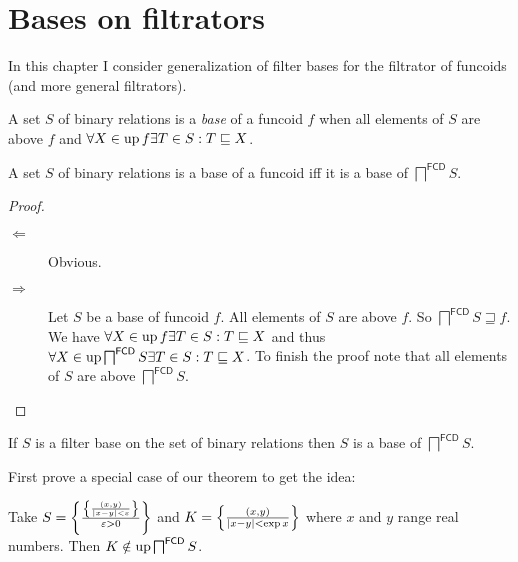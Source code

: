 \chapter{Bases on filtrators}

In this chapter I consider generalization of filter bases
for the filtrator of funcoids (and more general filtrators).


\begin{defn}
  A set $S$ of binary relations is a \emph{base} of a funcoid $f$ when all elements
  of $S$ are above $f$ and $\forall X \in \operatorname{up} f \exists T \in S : T
  \sqsubseteq X$.
\end{defn}

\begin{prop}
  A set $S$ of binary relations is a base of a funcoid iff it is a base of
  $\bigsqcap^{\mathsf{FCD}} S$.
\end{prop}

\begin{proof}
  ~
  \begin{description}
    \item[$\Leftarrow$] Obvious.
    
    \item[$\Rightarrow$] Let $S$ be a base of funcoid $f$. All elements of $S$
    are above $f$. So $\bigsqcap^{\mathsf{FCD}} S \sqsupseteq f$. We
    have $\forall X \in \operatorname{up} f \exists T \in S : T \sqsubseteq X$ and
    thus $\forall X \in \operatorname{up} \bigsqcap^{\mathsf{FCD}} S \exists T
    \in S : T \sqsubseteq X$. To finish the proof note that all elements of
    $S$ are above $\bigsqcap^{\mathsf{FCD}} S$.
  \end{description}
\end{proof}

\begin{thm}
  If $S$ is a filter base on the set of binary relations then $S$ is a base of
  $\bigsqcap^{\mathsf{FCD}} S$.
\end{thm}

First prove a special case of our theorem to get the idea:

\begin{example}
  Take $S = \left\{ \frac{
  \left\{ \frac{ (x, y) }{ | x - y | < \varepsilon }\right\}}{ \varepsilon > 0 }\right\}$ and $K = \left\{ \frac{ (x, y) }{
  | x - y | < \exp x }\right\}$ where $x$ and $y$ range real
  numbers. Then $K \notin \operatorname{up} \bigsqcap^{\mathsf{FCD}} S$.
\end{example}

